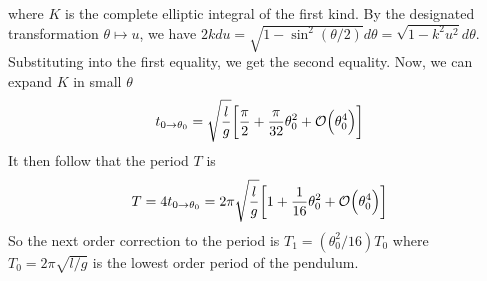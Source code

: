 \documentclass[12pt]{article}
\begin{document}
\begin{problem}{1}
\begin{solution}
    where $K$ is the complete elliptic integral of the first kind. By the
    designated transformation $\theta\mapsto u$, we have
    $2kdu=\sqrt{1-\sin^2(\theta/2)}d\theta=\sqrt{1-k^2u^2}d\theta$. Substituting
    into the first equality, we get the second equality. Now, we can expand $K$
    in small $\theta$
    \begin{equation}
        t_{0\to\theta_0}=\sqrt{\frac{l}{g}}\qty[\frac\pi2+\frac\pi{32}\theta_0^2+\order{\theta_0^4}]
    \end{equation}
    It then follow that the period $T$ is
    \begin{equation}
        T=4t_{0\to\theta_0}=2\pi\sqrt{\frac{l}{g}}\qty[1+\frac1{16}\theta_0^2+\order{\theta_0^4}]
    \end{equation}
    So the next order correction to the period is $T_1=(\theta_0^2/16)T_0$
    where $T_0=2\pi\sqrt{l/g}$ is the lowest order period of the pendulum.
\end{solution}

\end{problem}
\end{document}
